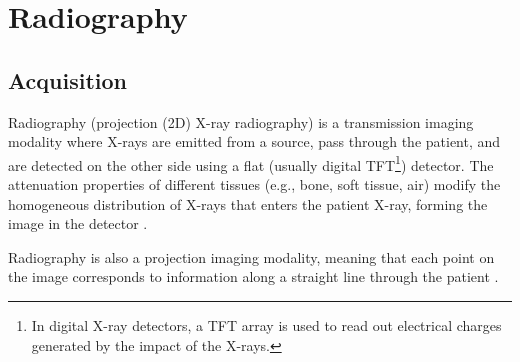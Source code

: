 \chapter{Radiography}

\section{Acquisition}
Radiography (projection (2D) X-ray radiography) is a transmission
imaging modality where X-rays are emitted from a source, pass through
the patient, and are detected on the other side using a flat (usually
digital TFT\footnote{In digital X-ray detectors, a TFT array is used
  to read out electrical charges generated by the impact of the
  X-rays.}) detector. The attenuation properties of different tissues
(e.g., bone, soft tissue, air) modify the homogeneous distribution of
X-rays that enters the patient X-ray, forming the image in the
detector \cite{bushberg2011essential}.

Radiography is also a projection imaging modality, meaning that each
point on the image corresponds to information along a straight line
through the patient \cite{bushberg2011essential}.

